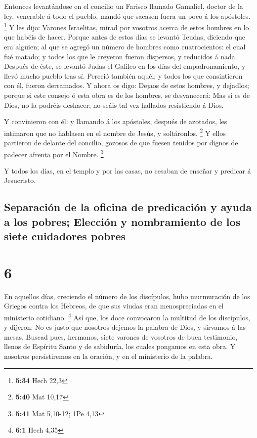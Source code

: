  Entonces levantándose en el concilio un Fariseo llamado
Gamaliel, doctor de la ley, venerable á todo el pueblo, mandó que
sacasen fuera un poco á los apóstoles. \footnote{\textbf{5:34} Hech 22,3}
 Y les dijo: Varones Israelitas, mirad por vosotros
acerca de estos hombres en lo que habéis de hacer. 
Porque antes de estos días se levantó Teudas, diciendo que era alguien;
al que se agregó un número de hombres como cuatrocientos: el cual fué
matado; y todos los que le creyeron fueron dispersos, y reducidos á
nada.  Después de éste, se levantó Judas el Galileo en
los días del empadronamiento, y llevó mucho pueblo tras sí. Pereció
también aquél; y todos los que consintieron con él, fueron derramados.
 Y ahora os digo: Dejaos de estos hombres, y dejadlos;
porque si este consejo ó esta obra es de los hombres, se desvanecerá:
 Mas si es de Dios, no la podréis deshacer; no seáis tal
vez hallados resistiendo á Dios.

 Y convinieron con él: y llamando á los apóstoles,
después de azotados, les intimaron que no hablasen en el nombre de
Jesús, y soltáronlos. \footnote{\textbf{5:40} Mat 10,17} 
Y ellos partieron de delante del concilio, gozosos de que fuesen tenidos
por dignos de padecer afrenta por el Nombre. \footnote{\textbf{5:41} Mat
  5,10-12; 1Pe 4,13}

 Y todos los días, en el templo y por las casas, no
cesaban de enseñar y predicar á Jesucristo.

\hypertarget{separaciuxf3n-de-la-oficina-de-predicaciuxf3n-y-ayuda-a-los-pobres-elecciuxf3n-y-nombramiento-de-los-siete-cuidadores-pobres}{%
\subsection{Separación de la oficina de predicación y ayuda a los
pobres; Elección y nombramiento de los siete cuidadores
pobres}\label{separaciuxf3n-de-la-oficina-de-predicaciuxf3n-y-ayuda-a-los-pobres-elecciuxf3n-y-nombramiento-de-los-siete-cuidadores-pobres}}

\hypertarget{section-5}{%
\section{6}\label{section-5}}

 En aquellos días, creciendo el número de los discípulos,
hubo murmuración de los Griegos contra los Hebreos, de que sus viudas
eran menospreciadas en el ministerio cotidiano. \footnote{\textbf{6:1}
  Hech 4,35}  Así que, los doce convocaron la multitud de
los discípulos, y dijeron: No es justo que nosotros dejemos la palabra
de Dios, y sirvamos á las mesas.  Buscad pues, hermanos,
siete varones de vosotros de buen testimonio, llenos de Espíritu Santo y
de sabiduría, los cuales pongamos en esta obra.  Y
nosotros persistiremos en la oración, y en el ministerio de la palabra.

